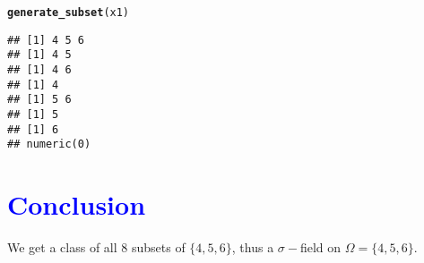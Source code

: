 \documentclass[11pt, a4paper]{article}\usepackage[]{graphicx}\usepackage[]{xcolor}
\makeatletter
\newcommand{\hldef}[1]{\textcolor[rgb]{0.345,0.345,0.345}{#1}}%
\newcommand{\hlkwd}[1]{\textcolor[rgb]{0.737,0.353,0.396}{\textbf{#1}}}%
\newenvironment{kframe}{%
 \def\at@end@of@kframe{}%
 \ifinner\ifhmode%
  \def\at@end@of@kframe{\end{minipage}}%
  \begin{minipage}{\columnwidth}%
 \fi\fi%
 \def\FrameCommand##1{\hskip\@totalleftmargin \hskip-\fboxsep
 \colorbox{shadecolor}{##1}\hskip-\fboxsep
     \hskip-\linewidth \hskip-\@totalleftmargin \hskip\columnwidth}%
 \MakeFramed {\advance\hsize-\width
   \@totalleftmargin\z@ \linewidth\hsize
   \@setminipage}}%
 {\par\unskip\endMakeFramed%
 \at@end@of@kframe}
\newenvironment{knitrout}{}{} %
\makeatother
\begin{document}
\begin{knitrout}
\color{fgcolor}\begin{kframe}
\begin{alltt}
\hlkwd{generate_subset}\hldef{(x1)}
\end{alltt}
\begin{verbatim}
## [1] 4 5 6
## [1] 4 5
## [1] 4 6
## [1] 4
## [1] 5 6
## [1] 5
## [1] 6
## numeric(0)
\end{verbatim}
\end{kframe}
\end{knitrout}




\section*{\faArrowAltCircleRight[regular] \textcolor{blue}{Conclusion}}

\smallpencil \hspace{0.3cm} We get a class of all 8 subsets of $\{4, 5, 6\}$, thus a $\sigma-$field on $\Omega = \{4, 5, 6\}$.
\end{document}
